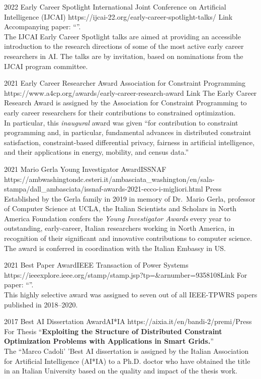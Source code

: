 \documentclass[localFont,alternative]{documentMETADATA}
\begin{document}
\begin{awards}
	\awardentryD
	{2022}
	{Early Career Spotlight}%
	{International Joint Conference on Artificial Intelligence (IJCAI)}
	{https://ijcai-22.org/early-career-spotlight-talks/}
	{Link}
	{Accompanying paper: ``''.\\
	The IJCAI Early Career Spotlight talks are aimed at providing an accessible introduction to the research directions of some of the most active early career researchers in AI.
	The talks are by invitation, based on nominations from the IJCAI program committee.
	}

	\awardentryD
	{2021}
	{Early Career Researcher Award}
	{Association for Constraint Programming}
	{https://www.a4cp.org/awards/early-career-research-award}
	{Link}
	{The Early Career Research Award is assigned by the Association for Constraint Programming to early career researchers for their 
	contributions to constrained optimization.\\
	In particular, this \emph{inaugural} award was given 
	``for contribution to constraint programming and, in particular,
	fundamental advances in distributed constraint satisfaction, constraint-based
	differential privacy, fairness in artificial intelligence, and their 
	applications in energy, mobility, and census data.''}

	\awardentryD
	{2021}
	{Mario Gerla Young Investigator Award}{ISSNAF}
	{https://ambwashingtondc.esteri.it/ambasciata_washington/en/sala-stampa/dall_ambasciata/issnaf-awards-2021-ecco-i-migliori.html}
	{Press}
	{
	Established by the Gerla family in 2019 in memory of Dr.~Mario Gerla, professor of Computer Science at UCLA, the Italian Scientists and Scholars in North America Foundation confers the \emph{Young Investigator Awards} every year to outstanding, early-career, Italian researchers working in North America, in recognition of their significant and innovative contributions to computer science.
	The award is conferred in coordination with the Italian Embassy in US.
	}

	\awardentryD
	{2021}
	{Best Paper Award}{IEEE Transaction of Power Systems}
	{https://ieeexplore.ieee.org/stamp/stamp.jsp?tp=\&arnumber=9358108}{Link}
	{
	For paper: ``''.\\
	This highly selective award was assigned to seven out of all IEEE-TPWRS papers published in 2018--2020.}

	\awardentryD
	{2017}
	{Best AI Dissertation Award}{AI*IA} %
	{https://aixia.it/en/bandi-2/premi/}{Press}
	{For Thesis ``\textbf{Exploiting the Structure of Distributed Constraint Optimization Problems with Applications in Smart Grids.}''\\
	The ``Marco Cadoli' 'Best AI dissertation is assigned by the Italian 
	Association for Artificial Intelligence (AI*IA) to a Ph.D. doctor 
	who have obtained the title in an Italian University based on the 
	quality and impact of the thesis work.
	}
\end{awards}
\end{document}
